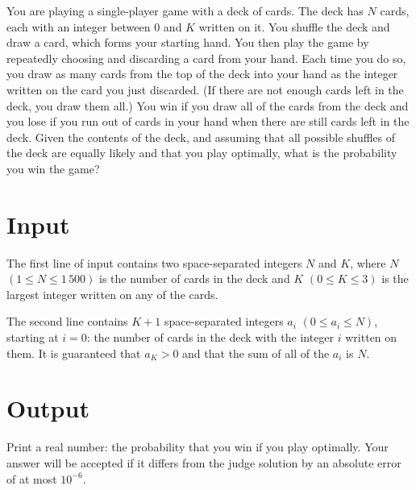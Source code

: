 
\newcommand{\bmaxn}{1\,500}
\newcommand{\bmaxk}{3}

You are playing a single-player game with a deck of cards. The deck has $N$ cards, each with an integer between $0$ and $K$ written on it. You shuffle the deck and draw a card, which forms your starting hand. You then play the game by repeatedly choosing and discarding a card from your hand. Each time you do so, you draw as many cards from the top of the deck into your hand as the integer written on the card you just discarded. (If there are not enough cards left in the deck, you draw them all.) You win if you draw all of the cards from the deck and you lose if you run out of cards in your hand when there are still cards left in the deck.  Given the contents of the deck, and assuming that all possible shuffles of the deck are equally likely and that you play optimally, what is the probability you win the game?

\section*{Input}
The first line of input contains two space-separated integers $N$ and $K$, where $N$ $(1 \leq N \leq \bmaxn)$ is the number of cards in the deck and $K$ $(0 \leq K \leq \bmaxk)$ is the largest integer written on any of the cards.

The second line contains $K+1$ space-separated integers $a_i$ $(0 \leq a_i \leq N)$, starting at $i=0$: the number of cards in the deck with the integer $i$ written on them. It is guaranteed that $a_K > 0$ and that the sum of all of the $a_i$ is $N$.

\section*{Output}
Print a real number: the probability that you win if you play optimally. Your answer will be accepted if it differs from the judge solution by an absolute error of at most $10^{-6}$.
